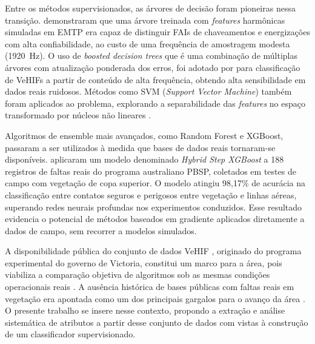 Entre os métodos supervisionados, as árvores de decisão foram pioneiras nessa
transição.  demonstraram que uma árvore treinada com
\textit{features} harmônicas simuladas em EMTP era capaz de distinguir FAIs de
chaveamentos e energizações com alta confiabilidade, ao custo de uma
frequência de amostragem modesta (1920~Hz). O uso de \textit{boosted decision
trees} que é uma combinação de múltiplas árvores com atualização ponderada dos erros, foi adotado por  para classificação de VeHIFs a partir de
conteúdo de alta frequência, obtendo alta sensibilidade em dados reais
ruidosos. Métodos como SVM (\textit{Support Vector Machine}) também foram
aplicados ao problema, explorando a separabilidade das \textit{features} no
espaço transformado por núcleos não lineares \cite{Aljohani2020}.

Algoritmos de ensemble mais avançados, como Random Forest e XGBoost,
passaram a ser utilizados à medida que bases de dados reais tornaram-se
disponíveis.  aplicaram um modelo denominado
\textit{Hybrid Step XGBoost} a 188 registros de faltas reais do programa
australiano PBSP, coletados em testes de campo com vegetação de copa
superior. O modelo atingiu 98,17\% de acurácia na classificação entre
contatos seguros e perigosos entre vegetação e linhas aéreas, superando redes
neurais profundas nos experimentos conduzidos. Esse resultado evidencia o
potencial de métodos baseados em gradiente aplicados diretamente a dados de
campo, sem recorrer a modelos simulados.

A disponibilidade pública do conjunto de dados VeHIF
\cite{Gomes2021VeHIF}, originado do programa experimental do governo de
Victoria, constitui um marco para a área, pois viabiliza a comparação objetiva
de algoritmos sob as mesmas condições operacionais reais
\cite{8, vic_bushfire_report}. A ausência histórica de bases públicas com
faltas reais em vegetação era apontada como um dos principais gargalos para o
avanço da área \cite{Gomes2021VeHIF}. O presente trabalho se insere nesse
contexto, propondo a extração e análise sistemática de atributos a partir
desse conjunto de dados com vistas à construção de um classificador
supervisionado.